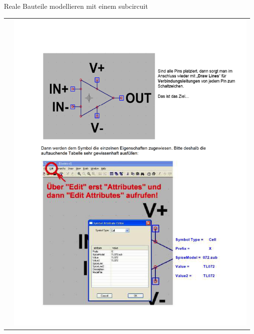\begin{frame}[t]{Reale Bauteile modellieren mit einem subcircuit}
\begin{spacing}{0.9}
\begin{tiny}
\begin{table}[h!]
\begin{tabular}{p{5cm} p{5cm}}
            &
            \begin{minipage}{0.5\textwidth}
                \includegraphics[width=\linewidth]{pictures/legacy/tl072_4.png}
            \end{minipage} 
      \end{tabular}
    \end{table}
    \end{tiny} \end{spacing}
\end{frame}

